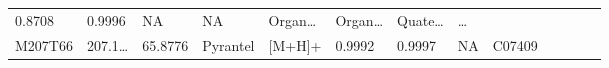 \documentclass[
]{article}
\begin{document}
\begin{longtable}[]{@{}lllllllllllll@{}}
\begin{minipage}[t]{0.07\columnwidth}
0.8708\strut
\end{minipage} & \begin{minipage}[t]{0.07\columnwidth}\raggedright
0.9996\strut
\end{minipage} & \begin{minipage}[t]{0.05\columnwidth}\raggedright
NA\strut
\end{minipage} & \begin{minipage}[t]{0.04\columnwidth}\raggedright
NA\strut
\end{minipage} & \begin{minipage}[t]{0.05\columnwidth}\raggedright
Organ\ldots{}\strut
\end{minipage} & \begin{minipage}[t]{0.05\columnwidth}\raggedright
Organ\ldots{}\strut
\end{minipage} & \begin{minipage}[t]{0.05\columnwidth}\raggedright
Quate\ldots{}\strut
\end{minipage} & \begin{minipage}[t]{0.02\columnwidth}\raggedright
\ldots{}\strut
\end{minipage}\tabularnewline
\begin{minipage}[t]{0.05\columnwidth}\raggedright
M207T66\strut
\end{minipage} & \begin{minipage}[t]{0.05\columnwidth}\raggedright
207.1\ldots{}\strut
\end{minipage} & \begin{minipage}[t]{0.05\columnwidth}\raggedright
65.8776\strut
\end{minipage} & \begin{minipage}[t]{0.05\columnwidth}\raggedright
Pyrantel\strut
\end{minipage} & \begin{minipage}[t]{0.05\columnwidth}\raggedright
{[}M+H{]}+\strut
\end{minipage} & \begin{minipage}[t]{0.07\columnwidth}\raggedright
0.9992\strut
\end{minipage} & \begin{minipage}[t]{0.07\columnwidth}\raggedright
0.9997\strut
\end{minipage} & \begin{minipage}[t]{0.05\columnwidth}\raggedright
NA\strut
\end{minipage} & \begin{minipage}[t]{0.04\columnwidth}\raggedright
C07409\strut

\end{minipage}
\end{longtable}
\end{document}
